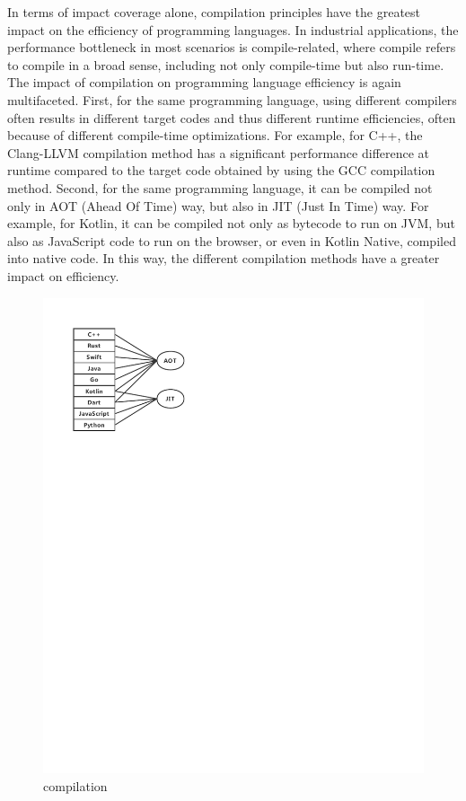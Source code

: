 In terms of impact coverage alone, compilation principles have the greatest impact on the efficiency of programming languages. In industrial applications, the performance bottleneck in most scenarios is compile-related, where compile refers to compile in a broad sense, including not only compile-time but also run-time. The impact of compilation on programming language efficiency is again multifaceted. First, for the same programming language, using different compilers often results in different target codes and thus different runtime efficiencies, often because of different compile-time optimizations. For example, for C++, the Clang-LLVM compilation method has a significant performance difference at runtime compared to the target code obtained by using the GCC compilation method. Second, for the same programming language, it can be compiled not only in AOT (Ahead Of Time) way, but also in JIT (Just In Time) way. For example, for Kotlin, it can be compiled not only as bytecode to run on JVM, but also as JavaScript code to run on the browser, or even in Kotlin Native, compiled into native code. In this way, the different compilation methods have a greater impact on efficiency.


\begin{figure}[htbp]
    \centerline{\includegraphics[scale=0.8]{figures/compilation}}
    \caption{compilation}
    \label{fig:compilation}
\end{figure}

